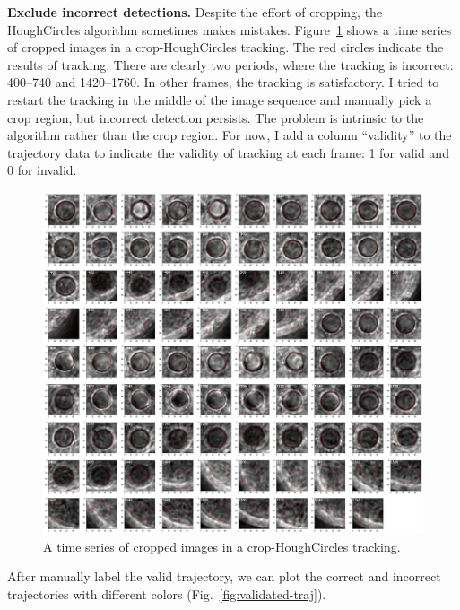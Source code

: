 \documentclass[onecolumn,aps, pre,amsmath,amssymb,longbibliography,11pt]{revtex4-2}
\begin{document}
\textbf{Exclude incorrect detections.}
Despite the effort of cropping, the HoughCircles algorithm sometimes makes mistakes.
Figure~\ref{fig:crop-HoughCircles-montage} shows a time series of cropped images in a crop-HoughCircles tracking.
The red circles indicate the results of tracking.
There are clearly two periods, where the tracking is incorrect: 400--740 and 1420--1760.
In other frames, the tracking is satisfactory.
I tried to restart the tracking in the middle of the image sequence and manually pick a crop region, but incorrect detection persists.
The problem is intrinsic to the algorithm rather than the crop region.
For now, I add a column ``validity'' to the trajectory data to indicate the validity of tracking at each frame: 1 for valid and 0 for invalid.

\begin{figure}[h]
  \includegraphics[width=6in]{crop-HoughCircles-montage.jpg}
  \caption{A time series of cropped images in a crop-HoughCircles tracking.}
  \label{fig:crop-HoughCircles-montage}
\end{figure}

After manually label the valid trajectory, we can plot the correct and incorrect trajectories with different colors (Fig.~\ref{fig:validated-traj}).
\end{document}
